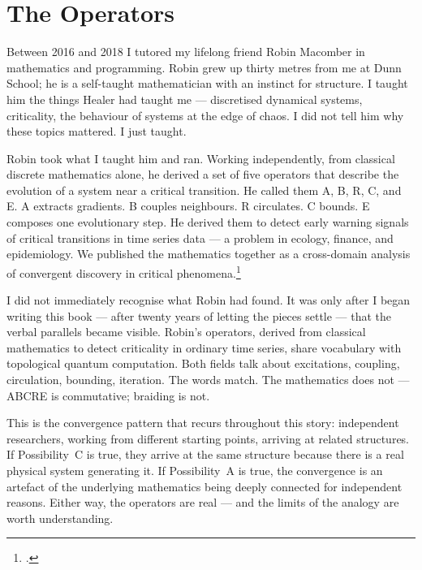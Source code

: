 \section*{The Operators}
\label{pos21:the-operators}



Between 2016 and 2018 I tutored my lifelong friend Robin Macomber in mathematics and programming. Robin grew up thirty metres from me at Dunn School; he is a self-taught mathematician with an instinct for structure. I taught him the things Healer had taught me --- discretised dynamical systems, criticality, the behaviour of systems at the edge of chaos. I did not tell him why these topics mattered. I just taught.

Robin took what I taught him and ran. Working independently, from classical discrete mathematics alone, he derived a set of five operators that describe the evolution of a system near a critical transition. He called them A, B, R, C, and E\@. A extracts gradients. B couples neighbours. R circulates. C bounds. E composes one evolutionary step. He derived them to detect early warning signals of critical transitions in time series data --- a problem in ecology, finance, and epidemiology. We published the mathematics together as a cross-domain analysis of convergent discovery in critical phenomena.\footcite{stephenson2025}

I did not immediately recognise what Robin had found. It was only after I began writing this book --- after twenty years of letting the pieces settle --- that the verbal parallels became visible. Robin's operators, derived from classical mathematics to detect criticality in ordinary time series, share vocabulary with topological quantum computation. Both fields talk about excitations, coupling, circulation, bounding, iteration. The words match. The mathematics does not --- ABCRE is commutative; braiding is not.

This is the convergence pattern that recurs throughout this story: independent researchers, working from different starting points, arriving at related structures. If Possibility~C is true, they arrive at the same structure because there is a real physical system generating it. If Possibility~A is true, the convergence is an artefact of the underlying mathematics being deeply connected for independent reasons. Either way, the operators are real --- and the limits of the analogy are worth understanding.


